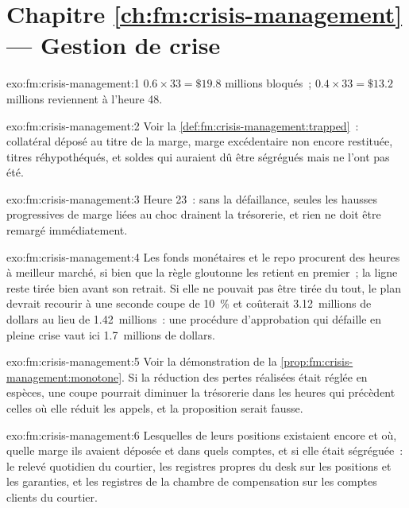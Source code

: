 \section*{Chapitre \ref{ch:fm:crisis-management} --- Gestion de crise}

\begin{solution}{exo:fm:crisis-management:1}
$0.6\times33=\$19.8$ millions bloqués~; $0.4\times33=\$13.2$ millions reviennent à l'heure 48.
\end{solution}

\begin{solution}{exo:fm:crisis-management:2}
Voir la \cref{def:fm:crisis-management:trapped}~: collatéral déposé au titre de la marge, marge excédentaire non encore restituée, titres réhypothéqués, et soldes
qui auraient dû être ségrégués mais ne l'ont pas été.
\end{solution}

\begin{solution}{exo:fm:crisis-management:3}
Heure 23~: sans la défaillance, seules les hausses progressives de marge liées au choc drainent la trésorerie, et rien ne doit être remargé immédiatement.
\end{solution}

\begin{solution}{exo:fm:crisis-management:4}
Les fonds monétaires et le repo procurent des heures à meilleur marché, si bien que la règle gloutonne les retient en premier~; la ligne reste tirée bien avant son
retrait. Si elle ne pouvait pas être tirée du tout, le plan devrait recourir à une seconde coupe de 10~\% et coûterait 3.12~millions de dollars au lieu de 1.42~millions~: une procédure d'approbation
qui défaille en pleine crise vaut ici 1.7~millions de dollars.
\end{solution}

\begin{solution}{exo:fm:crisis-management:5}
Voir la démonstration de la \cref{prop:fm:crisis-management:monotone}. Si la réduction des pertes réalisées était réglée en espèces, une coupe pourrait diminuer la trésorerie dans les heures qui précèdent
celles où elle réduit les appels, et la proposition serait fausse.
\end{solution}

\begin{solution}{exo:fm:crisis-management:6}
Lesquelles de leurs positions existaient encore et où, quelle marge ils avaient déposée et dans quels comptes, et si elle était ségréguée~: le
relevé quotidien du courtier, les registres propres du desk sur les positions et les garanties, et les registres de la chambre de compensation sur les comptes clients du courtier.
\end{solution}

